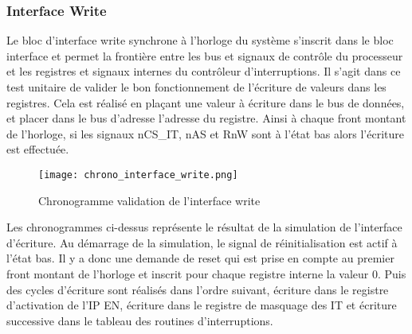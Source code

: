 \subsubsection{Interface Write}
Le bloc d'interface write synchrone à l'horloge du système s'inscrit dans le bloc interface et permet la frontière entre les bus et signaux de contrôle du processeur et les registres et signaux internes du contrôleur d'interruptions.
Il s'agit dans ce test unitaire de valider le bon fonctionnement de l'écriture de valeurs dans les registres.
Cela est réalisé en plaçant une valeur à écriture dans le bus de données, et placer dans le bus d'adresse l'adresse du registre.
Ainsi à chaque front montant de l'horloge, si les signaux nCS\_IT, nAS et RnW sont à l'état bas alors l'écriture est effectuée.
\begin{figure}[H]
	\centering
	\texttt{[image: chrono\_interface\_write.png]}
	\caption{Chronogramme validation de l'interface write}
	\label{fig:chrono_interface_write}
\end{figure}
Les chronogrammes ci-dessus représente le résultat de la simulation de l'interface d'écriture.
Au démarrage de la simulation, le signal de réinitialisation est actif à l'état bas.
Il y a donc une demande de reset qui est prise en compte au premier front montant de l'horloge et inscrit pour chaque registre interne la valeur 0.
Puis des cycles d'écriture sont réalisés dans l'ordre suivant, écriture dans le registre d'activation de l'IP EN, écriture dans le registre de masquage des IT et écriture successive dans le tableau des routines d'interruptions.
